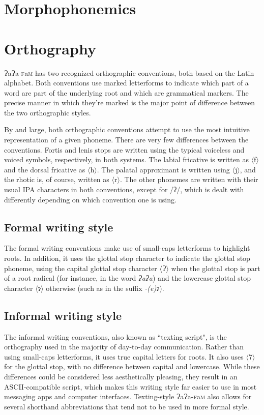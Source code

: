 \documentclass[a4paper,10pt,twoside,openright]{memoir}
\newcommand{\lang}{ɁaɁa-\textsc{f}a\textsc{m}}
\newcommand{\sqbrack}[1]{$\langle$#1$\rangle$}
\newcommand{\phipa}[1]{/#1/}
\newcommand{\glotstop}{ʔ}
\newcommand{\bigglot}{Ɂ}
\newcommand{\lilglot}{ɂ}
\begin{document}
\section{Morphophonemics}

\section{Orthography}

\lang{} has two recognized orthographic conventions, both based on the Latin alphabet. Both conventions use marked letterforms to indicate which part of a word are part of the underlying root and which are grammatical markers. The precise manner in which they're marked is the major point of difference between the two orthographic styles.

By and large, both orthographic conventions attempt to use the most intuitive representation of a given phoneme. There are very few differences between the conventions. Fortis and lenis stops are written using the typical voiceless and voiced symbols, respectively, in both systems. The labial fricative is written as \sqbrack{f} and the dorsal fricative as \sqbrack{h}. The palatal approximant is written using \sqbrack{j}, and the rhotic is, of course, written as \sqbrack{r}. The other phonemes are written with their usual IPA characters in both conventions, except for \phipa{\glotstop}, which is dealt with differently depending on which convention one is using.

\subsection{Formal writing style}

The formal writing conventions make use of small-caps letterforms to highlight roots. In addition, it uses the glottal stop character to indicate the glottal stop phoneme, using the capital glottal stop character \sqbrack{\bigglot} when the glottal stop is part of a root radical (for instance, in the word \textit{\bigglot a\bigglot a}) and the lowercase glottal stop character \sqbrack{\lilglot} otherwise (such as in the suffix \textit{-(e)\lilglot}).

\subsection{Informal writing style}

The informal writing conventions, also known as ``texting script", is the orthography used in the majority of day-to-day communication. Rather than using small-caps letterforms, it uses true capital letters for roots. It also uses \sqbrack{7} for the glottal stop, with no difference between capital and lowercase. While these differences could be considered less aesthetically pleasing, they result in an ASCII-compatible script, which makes this writing style far easier to use in most messaging apps and computer interfaces. Texting-style \lang{} also allows for several shorthand abbreviations that tend not to be used in more formal style.
\end{document}
